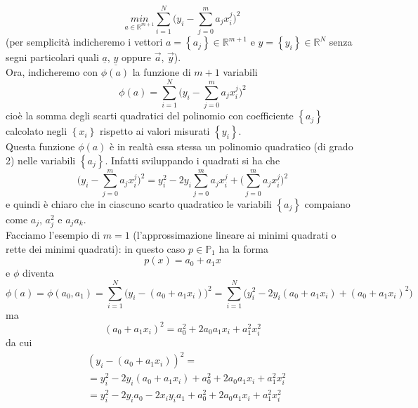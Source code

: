 \documentclass[12pt,a4paper]{article}
\begin{document}
\begin{equation*}
    \underset{a \in \mathbb{R}^{m+1}}{min}\sum_{i=1}^N \biggl( y_i - \sum_{j=0}^m a_j x_i^j \biggr) ^2
\end{equation*}
(per semplicità indicheremo i vettori $a = \left\{ a_j \right\} \in \mathbb{R}^{m+1}$ e $y = \left\{ y_i \right\} \in \mathbb{R}^{N}$ senza segni particolari quali $\underline{a}$, $\underline{y}$ oppure $\Vec{a}$, $\Vec{y}$). \\
Ora, indicheremo con $\phi(a)$ la funzione di $m+1$ variabili 
\begin{equation*}
    \phi(a) = \sum_{i=1}^N \biggl( y_i - \sum_{j=0}^m a_j x_i^j \biggr) ^2
\end{equation*}
cioè la somma degli scarti quadratici del polinomio con coefficiente $\left\{ a_j \right\}$ calcolato negli $\left\{ x_i \right\}$ rispetto ai valori misurati $\left\{ y_i \right\}$. \\
Questa funzione $\phi(a)$ è in realtà essa stessa un polinomio quadratico (di grado 2) nelle variabili $\left\{ a_j \right\}$. Infatti sviluppando i quadrati si ha che
\begin{equation*}
    \biggl( y_i - \sum_{j=0}^m a_j x_i^j \biggr)^2 = y_i^2 - 2y_i\sum_{j=0}^m a_j x_i^j + \biggl( \sum_{j=0}^m a_j x_i^j \biggr)^2
\end{equation*}
e quindi è chiaro che in ciascuno scarto quadratico le variabili $\left\{ a_j \right\}$ compaiano come $a_j$, $a_j^2$ e $a_ja_k$. \\
Facciamo l'esempio di $m=1$ (l'approssimazione lineare ai minimi quadrati o rette dei minimi quadrati): in questo caso $p \in \mathbb{P}_1$ ha la forma 
\begin{equation*}
    p(x) = a_0 + a_1x
\end{equation*}
e $\phi$ diventa
\begin{equation*}
    \phi(a) = \phi(a_0, a_1) = \sum_{i=1}^N \biggl( y_i - (a_0+a_1x_i) \biggr) ^2 = \sum_{i=1}^N \biggl( y_i^2 - 2y_i(a_0+a_1x_i) + (a_0+a_1x_i)^2 \biggr)
\end{equation*}
ma 
\begin{equation*}
    (a_0+a_1x_i)^2 = a_0^2 + 2a_0a_1x_i + a_1^2x_i^2 
\end{equation*}
da cui
\begin{align*}
    & (y_i - (a_0+a_1x_i))^2 = \\
    & = y_i^2 - 2y_i(a_0+a_1x_i) + a_0^2 + 2a_0a_1x_i + a_1^2x_i^2 \\
    & = y_i^2 - 2y_ia_0 - 2x_iy_ia_1 + a_0^2 + 2a_0a_1x_i + a_1^2x_i^2
\end{align*}
\end{document}
